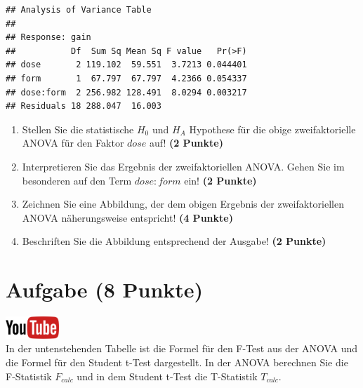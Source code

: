 \documentclass[a4paper, 9pt]{scrartcl}\usepackage[]{graphicx}\usepackage[]{xcolor}
\makeatletter
\newenvironment{kframe}{%
 \def\at@end@of@kframe{}%
 \ifinner\ifhmode%
  \def\at@end@of@kframe{\end{minipage}}%
  \begin{minipage}{\columnwidth}%
 \fi\fi%
 \def\FrameCommand##1{\hskip\@totalleftmargin \hskip-\fboxsep
 \colorbox{shadecolor}{##1}\hskip-\fboxsep
     \hskip-\linewidth \hskip-\@totalleftmargin \hskip\columnwidth}%
 \MakeFramed {\advance\hsize-\width
   \@totalleftmargin\z@ \linewidth\hsize
   \@setminipage}}%
 {\par\unskip\endMakeFramed%
 \at@end@of@kframe}
\newenvironment{knitrout}{}{} %
\makeatother
\begin{document}
\begin{knitrout}
\color{fgcolor}\begin{kframe}
\begin{verbatim}
## Analysis of Variance Table
## 
## Response: gain
##           Df  Sum Sq Mean Sq F value   Pr(>F)
## dose       2 119.102  59.551  3.7213 0.044401
## form       1  67.797  67.797  4.2366 0.054337
## dose:form  2 256.982 128.491  8.0294 0.003217
## Residuals 18 288.047  16.003
\end{verbatim}
\end{kframe}
\end{knitrout}

\begin{enumerate}
\item Stellen Sie die statistische $H_0$ und $H_A$ Hypothese f{\"u}r die obige
  zweifaktorielle ANOVA f{\"u}r den Faktor $dose$
  auf! \textbf{(2 Punkte)}
\item Interpretieren Sie das Ergebnis der zweifaktoriellen ANOVA. Gehen Sie
  im besonderen auf den Term $dose:form$ ein! \textbf{(2 Punkte)}
\item Zeichnen Sie eine Abbildung, der dem obigen Ergebnis der
  zweifaktoriellen ANOVA n{\"a}herungsweise entspricht! \textbf{(4 Punkte)}
\item Beschriften Sie die Abbildung entsprechend der \Rlogo Ausgabe! \textbf{(2 Punkte)}
\end{enumerate}
 
\clearpage

\section{Aufgabe \hfill (8 Punkte)}


\hfill\href{https://youtu.be/FjjJXkFJfIY}{\includegraphics[width =
  2cm]{img/youtube}}\\[1Ex]


In der untenstehenden Tabelle ist die Formel f{\"u}r den F-Test aus der ANOVA
und die Formel f{\"u}r den Student t-Test dargestellt. In der ANOVA berechnen
Sie die F-Statistik $F_{calc}$ und in dem Student t-Test die T-Statistik
$T_{calc}$.
\end{document}
